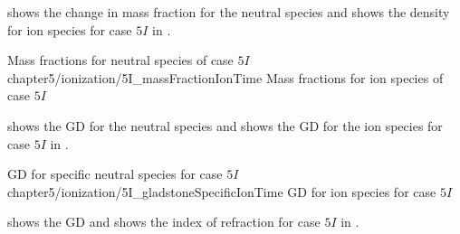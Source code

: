          shows the change in mass fraction for the
        neutral species and  shows the density for ion
        species for case $5I$ in .

        {Mass fractions for neutral species of case $5I$\label{fig:5IMassFractionNeutral}} 
        {chapter5/ionization/5I_massFractionIonTime}
        {Mass fractions for ion species of case $5I$\label{fig:5IMassFractionIon}} 

         shows the \gls{GD} for the neutral
        species and  shows the \gls{GD} for the
        ion species for case $5I$ in .

        {\gls{GD} for specific neutral species for case
        $5I$\label{fig:5IGladstoneDaleNeutral}} 
        {chapter5/ionization/5I_gladstoneSpecificIonTime}
        {\gls{GD} for ion species for case $5I$\label{fig:5IGladstoneDaleIon}} 

         shows the \gls{GD} and
         shows the index of refraction for case
        $5I$ in .

